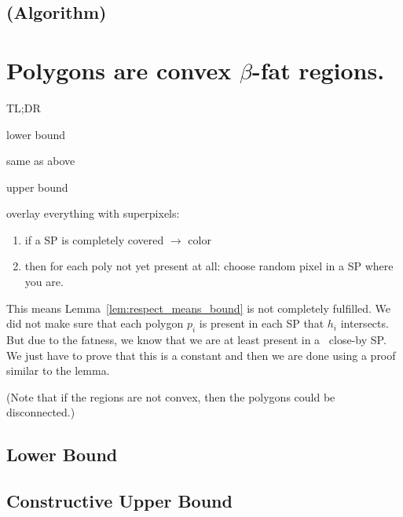 \documentclass{paper}
\begin{document}
{%

\subsection{(Algorithm)}
\label{sub:points_algo}







\section{Polygons are convex $\beta$-fat regions.}
\label{sec:fat}
TL;DR

lower bound

same as above

upper bound

overlay everything with superpixels:
\begin{enumerate}
	\item if a SP is completely covered $\rightarrow$ color
	\item then for each poly not yet present at all: choose random pixel in a SP where you are.
\end{enumerate}
This means Lemma~\ref{lem:respect_means_bound} is not completely fulfilled. We did not make sure that each polygon $p_i$ is present in each SP that $h_i$ intersects. But due to the fatness, we know that we are at least present in a ~close-by SP. We just have to prove that this is a constant and then we are done using a proof similar to the lemma.


(Note that if the regions are not convex, then the polygons could be disconnected.)


\subsection{Lower Bound}
\label{sub:fat_lower}




\subsection{Constructive Upper Bound}
\label{sub:fat_upper}



}
\end{document}
